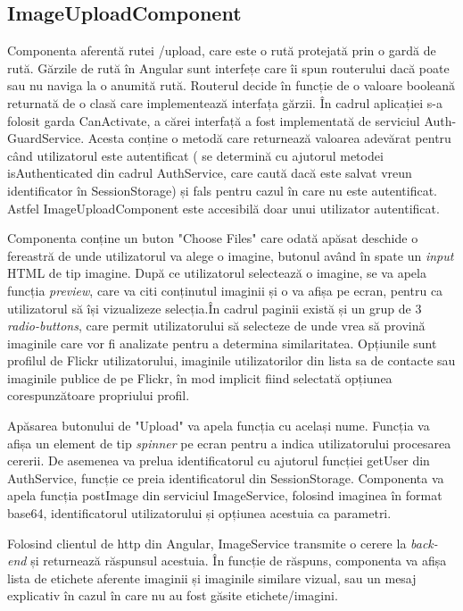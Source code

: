  \subsection{ImageUploadComponent}
Componenta aferentă rutei /upload, care este o rută protejată prin o gardă de rută. Gărzile de rută în Angular sunt interfețe care îi spun routerului dacă poate sau nu naviga la o anumită rută.\cite{auth-guards} Routerul decide în funcție de o valoare booleană returnată de o clasă care implementează interfața gărzii. În cadrul aplicației s-a folosit garda CanActivate, a cărei interfață a fost implementată de serviciul Auth-GuardService. Acesta conține o metodă care returnează valoarea adevărat pentru când utilizatorul este autentificat ( se determină cu ajutorul metodei isAuthenticated din cadrul AuthService, care caută dacă este salvat vreun identificator în SessionStorage) și fals pentru cazul în care nu este autentificat. Astfel ImageUploadComponent este accesibilă doar unui utilizator autentificat.

Componenta conține un buton "Choose Files" care odată apăsat deschide o fereastră de unde utilizatorul va alege o imagine, butonul având în spate un \textit{input} HTML de tip imagine. După ce utilizatorul selectează o imagine, se va apela funcția \textit{preview}, care va citi conținutul imaginii și o va afișa pe ecran, pentru ca utilizatorul să își vizualizeze selecția.În cadrul paginii există și un grup de 3 \textit{radio-buttons}, care permit utilizatorului să selecteze de unde vrea să provină imaginile care vor fi analizate pentru a determina similaritatea. Opțiunile sunt profilul de Flickr utilizatorului, imaginile utilizatorilor din lista sa de contacte sau imaginile publice de pe Flickr, în mod implicit fiind selectată opțiunea corespunzătoare propriului profil.

Apăsarea butonului de "Upload" va apela funcția cu același nume. Funcția va afișa un element de tip \textit{spinner} pe ecran pentru a indica utilizatorului procesarea cererii. De asemenea va prelua identificatorul cu ajutorul funcției getUser din AuthService, funcție ce preia identificatorul din SessionStorage. Componenta va apela funcția postImage din serviciul ImageService, folosind imaginea în format base64,  identificatorul utilizatorului și opțiunea acestuia ca parametri.

Folosind clientul de http din Angular, ImageService transmite o cerere la \textit{back-end} și returnează răspunsul acestuia. În funcție de răspuns, componenta va afișa lista de etichete aferente imaginii și imaginile similare vizual, sau un mesaj explicativ în cazul în care nu au fost găsite etichete/imagini.

